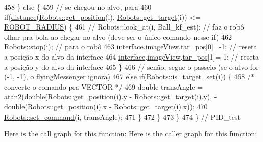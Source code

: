 \begin{DoxyCode}
458         \} \textcolor{keywordflow}{else} \{
459             \textcolor{comment}{// se chegou no alvo, para}
460             \textcolor{keywordflow}{if}(\hyperlink{class_cam_cap_a6595a726e77091a8accf19e62dc55e41}{distance}(\hyperlink{class_robots_a1fca8f2f5070176faa6ba1efa2f1ff14}{Robots::get\_position}(i), 
      \hyperlink{class_robots_a8a4fe339df4823e45cf34d9fb8daa64b}{Robots::get\_target}(i)) <= \hyperlink{camcap_8hpp_ab69dd643c61be536f4dc344cf7da0be6}{ROBOT\_RADIUS}) \{
461                 \textcolor{comment}{// Robots::look\_at(i, Ball\_kf\_est); // faz o robô olhar pra bola ao chegar no alvo (deve
       ser o único comando nesse if)}
462                 \hyperlink{class_robots_ac3452d86940fa017a16f7be4fe099d89}{Robots::stop}(i); \textcolor{comment}{// para o robô}
463                 \hyperlink{class_cam_cap_a58002893dfb61307042ddbba0c362dcd}{interface}.\hyperlink{class_v_s_s_s___g_u_i_1_1_v4_l_interface_a2c99f4d9fad8a34fa98d5b61beb06745}{imageView}.\hyperlink{class_image_view_a569238a3b9d094c11637673dba40bf29}{tar\_pos}[0]=-1; \textcolor{comment}{// reseta a posição x do alvo
       da interface}
464                 \hyperlink{class_cam_cap_a58002893dfb61307042ddbba0c362dcd}{interface}.\hyperlink{class_v_s_s_s___g_u_i_1_1_v4_l_interface_a2c99f4d9fad8a34fa98d5b61beb06745}{imageView}.\hyperlink{class_image_view_a569238a3b9d094c11637673dba40bf29}{tar\_pos}[1]=-1; \textcolor{comment}{// reseta a posição y do alvo
       da interface}
465             \}
466             \textcolor{comment}{// senão, segue o passeio (se o alvo for (-1, -1), o flyingMessenger ignora)}
467             \textcolor{keywordflow}{else} \textcolor{keywordflow}{if}(\hyperlink{class_robots_ad79a530bb3c696a351f11f5698fb4960}{Robots::is\_target\_set}(i)) \{
468                 \textcolor{comment}{/* converte o comando pra VECTOR */}
469                 \textcolor{keywordtype}{double} transAngle = atan2(\textcolor{keywordtype}{double}(\hyperlink{class_robots_a1fca8f2f5070176faa6ba1efa2f1ff14}{Robots::get\_position}(i).y - 
      \hyperlink{class_robots_a8a4fe339df4823e45cf34d9fb8daa64b}{Robots::get\_target}(i).y), -\textcolor{keywordtype}{double}(\hyperlink{class_robots_a1fca8f2f5070176faa6ba1efa2f1ff14}{Robots::get\_position}(i).x - 
      \hyperlink{class_robots_a8a4fe339df4823e45cf34d9fb8daa64b}{Robots::get\_target}(i).x));
470                 \hyperlink{class_robots_ae5034abea0160aac1d77ad154ee77f64}{Robots::set\_command}(i, transAngle);
471             \}
472         \}
473     \}
474 \} \textcolor{comment}{// PID\_test}
\end{DoxyCode}
Here is the call graph for this function\+:
Here is the caller graph for this function\+:
\mbox{\label{class_cam_cap_a0f09ee70dc70ffad088a87bd3011592d}} 
